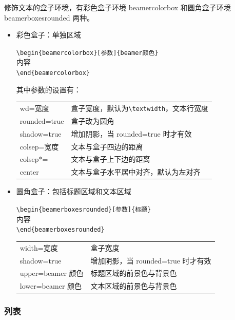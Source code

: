 修饰文本的盒子环境，有彩色盒子环境 beamercolorbox 和圆角盒子环境 beamerboxesrounded 两种。
\begin{itemize}
  \item 彩色盒子：单独区域

\color{grass}
\begin{minipage}{12cm}
\verb$\begin{beamercolorbox}[参数]{beamer颜色}$\\
内容\\
\verb$\end{beamercolorbox}$
\end{minipage}
\normalcolor

其中参数的设置有：

\begin{tabular}{ll}
  wd=宽度 & 盒子宽度，默认为\verb$\textwidth$，文本行宽度 \\
  rounded=true & 盒子改为圆角 \\
  shadow=true & 增加阴影，当 rounded=true 时才有效 \\
  colsep=宽度 & 文本与盒子四边的距离 \\
  colsep$*$= & 文本与盒子上下边的距离 \\
  center & 文本与盒子水平居中对齐，默认为左对齐 \\
\end{tabular}

  \item 圆角盒子：包括标题区域和文本区域


\color{grass}
\begin{minipage}{12cm}
\verb$\begin{beamerboxesrounded}[参数]{标题}$\\
内容\\
\verb$\end{beamerboxesrounded}$
\end{minipage}
\normalcolor

\begin{tabular}{ll}
   width=宽度 & 盒子宽度 \\
  shadow=true & 增加阴影，当 rounded=true 时才有效 \\
  upper=beamer 颜色 & 标题区域的前景色与背景色 \\
  lower=beamer 颜色 & 文本区域的前景色与背景色 \\
\end{tabular}
\end{itemize}

\subsubsection{列表}

